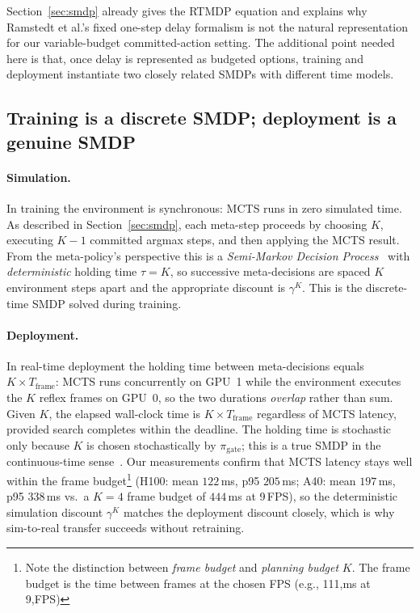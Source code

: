 \documentclass{article}
\newcommand{\pigate}{\pi_{\mathrm{gate}}}
\begin{document}
Section~\ref{sec:smdp} already gives the RTMDP equation and explains why
Ramstedt et al.'s fixed one-step delay formalism is not the natural
representation for our variable-budget committed-action setting.
The additional point needed here is that, once delay is represented as
budgeted options, training and deployment instantiate two closely related
SMDPs with different time models.

\subsection*{Training is a discrete SMDP; deployment is a genuine SMDP}

\paragraph{Simulation.}
In training the environment is synchronous: MCTS runs in zero simulated time.
As described in Section~\ref{sec:smdp}, each meta-step proceeds by choosing
$K$, executing $K{-}1$ committed argmax steps, and then applying the MCTS
result. From the meta-policy's perspective this is a
\emph{Semi-Markov Decision Process}~\citep{puterman1994mdp} with
\emph{deterministic} holding time $\tau = K$, so successive meta-decisions are
spaced $K$ environment steps apart and the appropriate discount is $\gamma^K$.
This is the discrete-time SMDP solved during training.

\paragraph{Deployment.}
In real-time deployment the holding time between meta-decisions equals
$K \times T_{\mathrm{frame}}$: MCTS runs concurrently on GPU~1 while the
environment executes the $K$ reflex frames on GPU~0, so the two durations
\emph{overlap} rather than sum.
Given $K$, the elapsed wall-clock time is $K \times T_{\mathrm{frame}}$
regardless of MCTS latency, provided search completes within the deadline.
The holding time is stochastic only because $K$ is chosen stochastically
by $\pigate$; this is a true SMDP in the continuous-time
sense~\citep{puterman1994mdp}.
Our measurements confirm that MCTS latency stays well within the frame budget\footnote{Note the distinction between \emph{frame budget} and \emph{planning budget} $K$. The frame budget is the time between frames at the chosen FPS (e.g., 111,ms at 9,FPS)}
(H100: mean $122$\,ms, p95 $205$\,ms; A40: mean $197$\,ms, p95 $338$\,ms
vs.\ a $K{=}4$ frame budget of $444$\,ms at 9\,FPS), so the deterministic
simulation discount $\gamma^K$ matches the deployment discount closely,
which is why sim-to-real transfer succeeds without retraining.
\end{document}
